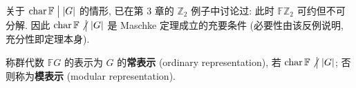 \begin{remark}\label{rem:maschke-sharp}
关于 $\operatorname{char}\mathbb{F}\mathrel{\big|}|G|$ 的情形, 已在第 3 章的 $\mathbb{Z}_2$ 例子中讨论过:
此时 $\mathbb{F}\mathbb{Z}_2$ 可约但不可分解. 因此 $\operatorname{char}\mathbb{F}\mathrel{\not\big|}|G|$ 是 Maschke 定理成立的充要条件
(必要性由该反例说明, 充分性即定理本身).
\end{remark}

\begin{definition}[常表示与模表示]\label{def:ordinary-modular}
称群代数 $\mathbb{F}G$ 的表示为 $G$ 的\textbf{常表示} (ordinary representation), 若 $\operatorname{char}\mathbb{F}\mathrel{\not\big|}|G|$;
否则称为\textbf{模表示} (modular representation).
\end{definition}
